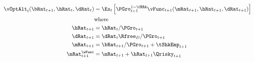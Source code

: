\documentclass[PortfolioChoiceWithRiskyHousing]{subfiles}
\begin{document}
\begin{equation}
	\begin{split}
		\vOptAlt_{t}(\bRat_{t+1}, \hRat_{t}, \dRat_{t}) & = \Ex_{t} \left[ \PGro_{t+1}^{1-\CRRA} \vFunc_{t+1}(\mRat_{t+1}, \hRat_{t+1}, \dRat_{t+1}) \right] \\
		& \text{where} \\
		\hRat_{t+1} & = \hRat_{t}/\PGro_{t+1} \\
		\dRat_{t+1} & = \dRat_{t}\Rfree_{D}/\PGro_{t+1} \\
		\mRat_{t+1} & = \bRat_{t+1}/\PGro_{t+1} + \tShkEmp_{t+1} \\
		\mRat_{t+1}^{\wFunc} & = \mRat_{t+1} + \hRat_{t+1} \Qrisky_{t+1}
	\end{split}
\end{equation}
\end{document}
